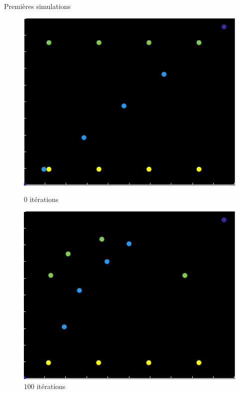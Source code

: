 \documentclass[final,hyperref={pdfpagelabels=false}]{beamer}
\begin{document}
\begin{frame}[t]
\begin{columns}[t]
\begin{column}{.465\textwidth}

\begin{block}{{\Large Premi\`eres simulations}}
\begin{figure}[h!]
   \begin{minipage}[b]{0.50\linewidth}
      \centering \includegraphics[scale=1.4]{simu_0.png}
      \caption{\text{ }$0$ it\'erations}
   \end{minipage}\hfill
   \begin{minipage}[b]{0.50\linewidth}   
      \centering \includegraphics[scale=1.4]{simu_100.png}
      \caption{\text{ } $100$ it\'erations}
   \end{minipage}
   \begin{minipage}[b]{0.50\linewidth}

\end{minipage}
\end{figure}
\end{block}
\end{column}
\end{columns}
\end{frame}
\end{document}

